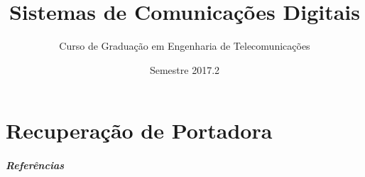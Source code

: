 \documentclass{beamer}
\title[Sist. de Com. Digital]{Sistemas de Comunicações Digitais}
\author[DETI]{Curso de Graduação em Engenharia de Telecomunicações}
\institute[UFC]{\normalsize Universidade Federal do Ceará}
\date{Semestre 2017.2}
\begin{document}
\begin{frame}
	\titlepage
\end{frame}


% 

% 

% 

% 

% 

% 

\part{Recuperação de Portadora}


% 

\begin{frame}
    \frametitle{Referências}
    
    
\end{frame}
\end{document}
